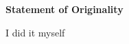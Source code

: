 %



\begin{alwayssingle} 
    \thispagestyle{empty}
    \begin{center}
        \vspace*{1.5cm}
        {\Large \bfseries Statement of Originality}
    \end{center}
    \vspace{0.5cm}
    I did it myself
\end{alwayssingle}